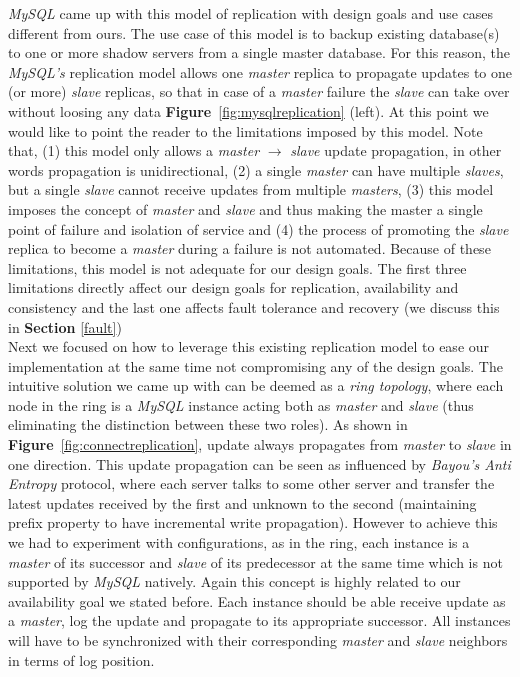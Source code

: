 \documentclass[12pt, twocolumn]{article}
\begin{document}
\emph{MySQL} came up with this model of replication with design goals and use cases different from ours. The use case of this model is to backup existing database(s) to one or more shadow servers from a single master database. For this reason, the \emph{MySQL's} replication model allows one \emph{master} replica to propagate updates to one (or more) \emph{slave} replicas, so that in case of a \emph{master} failure the \emph{slave} can take over without loosing any data \textbf{Figure}~\ref{fig:mysqlreplication} (left). At this point we would like to point the reader to the limitations imposed by this model. Note that,  (1) this model only allows a \emph{master} $\rightarrow$ \emph{slave} update propagation, in other words propagation is unidirectional, (2) a single \emph{master} can have multiple \emph{slaves}, but a single \emph{slave} cannot receive updates from multiple \emph{masters}, (3) this model imposes the concept of \emph{master} and \emph{slave} and thus making the master a single point of failure and isolation of service and (4) the process of promoting the \emph{slave} replica to become a \emph{master} during a failure is not automated. Because of these limitations, this model is not adequate for our design goals. The first three limitations directly affect our design goals for replication, availability and consistency and the last one affects fault tolerance and recovery (we discuss this in \textbf{Section} \ref{fault})\\
Next we focused on how to leverage this existing replication model to ease our implementation at the same time not compromising any of the design goals. The intuitive  solution we came up with can be deemed as a \emph{ring topology}, where each node in the ring is a \emph{MySQL} instance acting both as \emph{master} and \emph{slave} (thus eliminating the distinction between these two roles). As shown in \textbf{Figure}~\ref{fig:connectreplication}, update always propagates from \emph{master} to \emph{slave} in one direction. This update propagation can be seen as influenced by \emph{Bayou's Anti Entropy} protocol, where each server talks to some other server and transfer the latest updates received by the first and unknown to the second (maintaining prefix property to have incremental write propagation). However to achieve this we had to experiment with configurations, as in the ring, each instance is a \emph{master} of its successor and \emph{slave} of its predecessor at the same time which is not supported by \emph{MySQL} natively. Again this concept is highly related to our availability goal we stated before. Each instance should be able receive update as a \emph{master}, log the update and propagate to its appropriate successor. All instances will have to be synchronized with their corresponding \emph{master} and \emph{slave} neighbors in terms of log position. 
\end{document}
